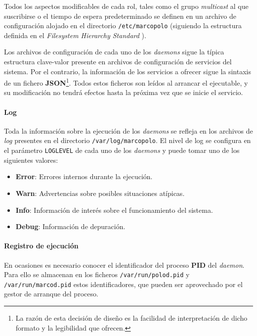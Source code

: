 Todos los aspectos modificables de cada rol, tales como el grupo \textit{multicast} al que suscribirse o el tiempo de espera predeterminado se definen en un archivo de configuración alojado en el directorio \texttt{/etc/marcopolo} (siguiendo la estructura definida en el \textit{Filesystem Hierarchy Standard} \cite{fhs}).

Los archivos de configuración de cada uno de los \textit{daemons} sigue la típica estructura clave-valor presente en archivos de configuración de servicios del sistema. Por el contrario, la información de los servicios a ofrecer sigue la sintaxis de un fichero \textbf{JSON}\footnote{La razón de esta decisión de diseño es la facilidad de interpretación de dicho formato y la legibilidad que ofrecen.}. Todos estos ficheros son leídos al arrancar el ejecutable, y su modificación no tendrá efectos hasta la próxima vez que se inicie el servicio.


\paragraph{Log\\}
Toda la información sobre la ejecución de los \textit{daemons} se refleja en los archivos de \textit{log} presentes en el directorio \texttt{/var/log/marcopolo}. El nivel de log se configura en el parámetro \texttt{LOGLEVEL} de cada uno de los \textit{daemons} y puede tomar uno de los siguientes valores:

\begin{itemize}
	\item \textbf{Error}: Errores internos durante la ejecución.
	\item \textbf{Warn}: Advertencias sobre posibles situaciones atípicas.
	\item \textbf{Info}: Información de interés sobre el funcionamiento del sistema.
	\item \textbf{Debug}: Información de depuración.
\end{itemize}

\paragraph{Registro de ejecución\\}

En ocasiones es necesario conocer el identificador del proceso \textbf{PID} del \textit{daemon}. Para ello se almacenan en los ficheros \texttt{/var/run/polod.pid} y \texttt{/var/run/marcod.pid} estos identificadores, que pueden ser aprovechado por el gestor de arranque del proceso.

